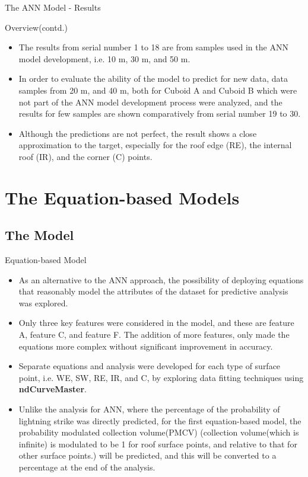 \documentclass{beamer}
\begin{document}
\begin{frame}{The ANN Model - Results}
    \begin{block}{Overview(contd.)}
    \begin{itemize}\justifying
        \item The results from serial number 1 to 18 are from samples used in the ANN model development, i.e. 10 m, 30 m, and 50 m.
        \item In order to evaluate the ability of the model to predict for new data, data samples from 20 m, and 40 m, both for Cuboid A and Cuboid B which were not part of the ANN model development process were analyzed, and the results for few samples are shown comparatively from serial number 19 to 30.
        \item Although the predictions are not perfect, the result shows a close approximation to the target, especially for the roof edge (RE), the internal roof (IR), and the corner (C) points.
    \end{itemize}
    \end{block}
\end{frame}

\section{The Equation-based Models}
\subsection{The Model}
\begin{frame}{Equation-based Model}
    \begin{itemize}\justifying
        \item As an alternative to the ANN approach, the possibility of deploying equations that reasonably model the attributes of the dataset for predictive analysis was explored.
        \item Only three key features were considered in the model, and these are feature A, feature C, and feature F. The addition of more features, only made the equations more complex without significant improvement in accuracy.
        \item Separate equations and analysis were developed for each type of surface point, i.e. WE, SW, RE, IR, and C, by exploring data fitting techniques using \textbf{ndCurveMaster}.
        \item Unlike the analysis for ANN, where the percentage of the probability of lightning strike was directly predicted, for the first equation-based model, the probability modulated collection volume(PMCV) (collection volume(which is infinite) is modulated to be 1 for roof surface points, and relative to that for other surface points.) will be predicted, and this will be converted to a percentage at the end of the analysis.
    \end{itemize}
\end{frame}
\end{document}
